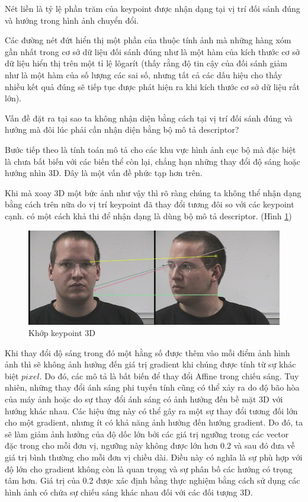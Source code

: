 \documentclass[conference]{IEEEtran}
\begin{document}
Nét liền là tỷ lệ phần trăm của keypoint được nhận dạng tại vị trí đối sánh đúng và hướng trong hình ảnh chuyển đổi.

Các đường nét đứt hiển thị một phần của thuộc tính ảnh mà những hàng xóm gần nhất trong cơ sở dữ liệu đối sánh đúng như là một hàm của kích thước cơ sở dữ liệu hiển thị trên một tỉ lệ lôgarít (thấy rằng độ tin cậy của đối sánh giảm như là một hàm của số lượng các sai số, nhưng tất cả các dấu hiệu cho thấy nhiều kết quả đúng sẽ tiếp tục được phát hiện ra khi kích thước cơ sở dữ liệu rất lớn).

Vấn đề đặt ra tại sao ta không nhận diện bằng cách tại vị trí đối sánh đúng và hướng mà đôi lúc phải cần nhận diện bằng bộ mô tả descriptor?

Bước tiếp theo là tính toán mô tả cho các khu vực hình ảnh cục bộ mà đặc biệt là chưa bất biến với các biến thể còn lại, chẳng hạn những thay đổi độ sáng hoặc hướng nhìn 3D.
Đây là một vấn đề phức tạp hơn trên.

Khi mà xoay 3D một bức ảnh như vậy thì rõ ràng chúng ta không thể nhận dạng bằng cách trên nữa do vị trí keypoint đã thay đổi tương đôi so với các keypoint cạnh. có một cách khả thi để nhận dạng là dùng bộ mô tả descriptor. (Hình \ref{fig:face3d_nam})

\begin{figure}
  \includegraphics[width=\linewidth]{face3d_nam}
  \caption{Khớp keypoint 3D}
  \label{fig:face3d_nam}
\end{figure}

Khi thay đổi độ sáng trong đó một hằng số được thêm vào mỗi điểm ảnh hình ảnh thì sẽ không ảnh hưởng đến giá trị gradient khi chúng được tính từ sự khác biệt $pixel$. Do đó, các mô tả là bất biến để thay đổi Affine trong chiếu sáng. Tuy nhiên, những thay đổi ánh sáng phi tuyến tính cũng có thể xảy ra do độ bão hòa của máy ảnh hoặc do sự thay đổi ánh sáng có ảnh hưởng đến bề mặt 3D với hướng khác nhau. Các hiệu ứng này có thể gây ra một sự thay đổi tương đối lớn cho một gradient, nhưng ít có khả năng ảnh hưởng đến hướng gradient. Do đó, ta sẽ làm giảm ảnh hưởng của độ dốc lớn bởi các giá trị ngưỡng trong các vector đặc trong cho mỗi đơn vị, ngưỡng này không được lớn hơn $0.2$ và sau đó đưa về giá trị bình thường cho mỗi đơn vị chiều dài. Điều này có nghĩa là sự phù hợp với độ lớn cho gradient không còn là quan trọng và sự phân bố các hướng có trọng tâm hơn. Giá trị của 0.2 được xác định bằng thực nghiệm bằng cách sử dụng các hình ảnh có chứa sự chiếu sáng khác nhau đối với các đối tượng 3D.
\end{document}
